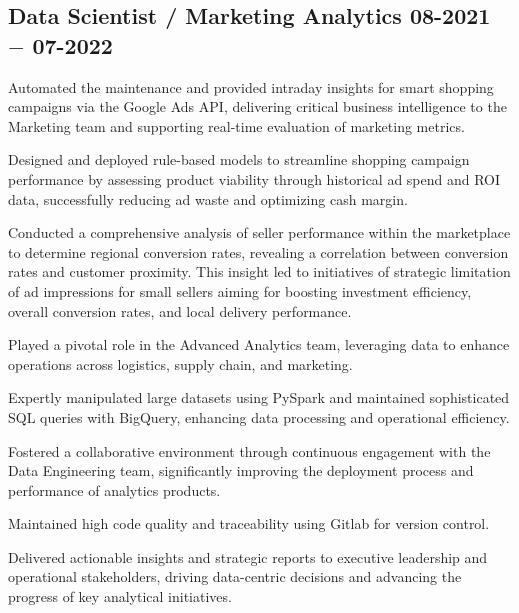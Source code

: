 \subsection{{Data Scientist / Marketing Analytics \hfill 08-2021 $-$ 07-2022}}
\begin{zitemize}
\item Automated the maintenance and provided intraday insights for smart shopping campaigns via the Google Ads API, delivering critical business intelligence to the Marketing team and supporting real-time evaluation of marketing metrics.
\item Designed and deployed rule-based models to streamline shopping campaign performance by assessing product viability through historical ad spend and ROI data, successfully reducing ad waste and optimizing cash margin.
\item Conducted a comprehensive analysis of seller performance within the marketplace to determine regional conversion rates, revealing a correlation between conversion rates and customer proximity. This insight led to initiatives of strategic limitation of ad impressions for small sellers aiming for boosting investment efficiency, overall conversion rates, and local delivery performance.
\item Played a pivotal role in the Advanced Analytics team, leveraging data to enhance operations across logistics, supply chain, and marketing. 
\item Expertly manipulated large datasets using PySpark and maintained sophisticated SQL queries with BigQuery, enhancing data processing and operational efficiency.
\item Fostered a collaborative environment through continuous engagement with the Data Engineering team, significantly improving the deployment process and performance of analytics products. 
\item Maintained high code quality and traceability using Gitlab for version control.
\item Delivered actionable insights and strategic reports to executive leadership and operational stakeholders, driving data-centric decisions and advancing the progress of key analytical initiatives.
\end{zitemize}


